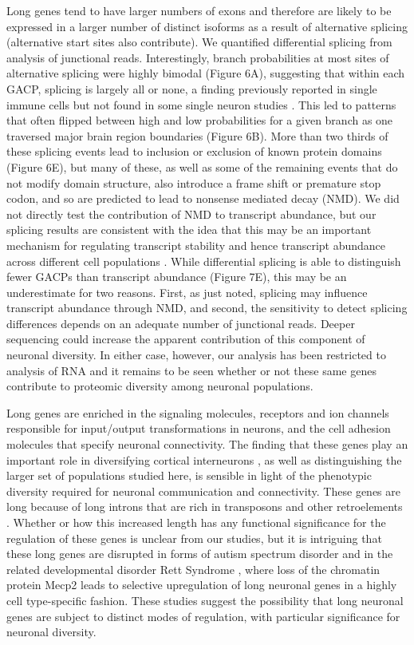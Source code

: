 Long genes tend to have larger numbers of exons and therefore are likely to be expressed in a larger number of distinct isoforms as a result of alternative splicing (alternative start sites also contribute). We quantified differential splicing from analysis of junctional reads. Interestingly, branch probabilities at most sites of alternative splicing were highly bimodal (Figure 6A), suggesting that within each GACP, splicing is largely all or none, a finding previously reported in single immune cells \citep{Shalek_2013} but not found in some single neuron studies \citep{Gokce_2016}. This led to patterns that often flipped between high and low probabilities for a given branch as one traversed major brain region boundaries (Figure 6B). More than two thirds of these splicing events lead to inclusion or exclusion of known protein domains (Figure 6E), but many of these, as well as some of the remaining events that do not modify domain structure, also introduce a frame shift or premature stop codon, and so are predicted to lead to nonsense mediated decay (NMD). We did not directly test the contribution of NMD to transcript abundance, but our splicing results are consistent with the idea that this may be an important mechanism for regulating transcript stability and hence transcript abundance across different cell populations \citep{Yan_2015,Traunmuller_2014}. While differential splicing is able to distinguish fewer GACPs than transcript abundance (Figure 7E), this may be an underestimate for two reasons. First, as just noted, splicing may influence transcript abundance through NMD, and second, the sensitivity to detect splicing differences depends on an adequate number of junctional reads. Deeper sequencing could increase the apparent contribution of this component of neuronal diversity. In either case, however, our analysis has been restricted to analysis of RNA and it remains to be seen whether or not these same genes contribute to proteomic diversity among neuronal populations.       

Long genes are enriched in the signaling molecules, receptors and ion channels responsible for input/output transformations in neurons, and the cell adhesion molecules that specify neuronal connectivity. The finding that these genes play an important role in diversifying cortical interneurons \citep{Paul_2017}, as well as distinguishing the larger set of populations studied here, is sensible in light of the phenotypic diversity required for neuronal communication and connectivity. These genes are long because of long introns that are rich in transposons and other retroelements \citep{Grishkevich_2014}. Whether or how this increased length has any functional significance for the regulation of these genes is unclear from our studies, but it is intriguing that these long genes are disrupted in forms of autism spectrum disorder \citep{Zylka_2015,Wei_2016} and in the related developmental disorder Rett Syndrome \citep{Sugino_2014,Gabel_2015}, where loss of the chromatin protein Mecp2 leads to selective upregulation of long neuronal genes in a highly cell type-specific fashion. These studies suggest the possibility that long neuronal genes are subject to distinct modes of regulation, with particular significance for neuronal diversity.   

